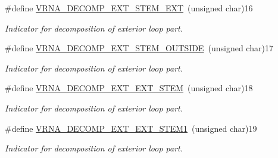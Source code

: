 \begin{DoxyCompactItemize}
\#define \mbox{\hyperlink{group__constraints_gabb09c5b78b75a44502fc77b950125c1e}{V\+R\+N\+A\+\_\+\+D\+E\+C\+O\+M\+P\+\_\+\+E\+X\+T\+\_\+\+S\+T\+E\+M\+\_\+\+E\+XT}}~(unsigned char)16
\begin{DoxyCompactList}\small\item\em Indicator for decomposition of exterior loop part. \end{DoxyCompactList}\item 
\mbox{\label{group__constraints_gae7554cd3ff089360c02e4920229e221c}} 
\#define \mbox{\hyperlink{group__constraints_gae7554cd3ff089360c02e4920229e221c}{V\+R\+N\+A\+\_\+\+D\+E\+C\+O\+M\+P\+\_\+\+E\+X\+T\+\_\+\+S\+T\+E\+M\+\_\+\+O\+U\+T\+S\+I\+DE}}~(unsigned char)17
\begin{DoxyCompactList}\small\item\em Indicator for decomposition of exterior loop part. \end{DoxyCompactList}\item 
\#define \mbox{\hyperlink{group__constraints_ga06efd054c9271438f6d82d4559d9e69f}{V\+R\+N\+A\+\_\+\+D\+E\+C\+O\+M\+P\+\_\+\+E\+X\+T\+\_\+\+E\+X\+T\+\_\+\+S\+T\+EM}}~(unsigned char)18
\begin{DoxyCompactList}\small\item\em Indicator for decomposition of exterior loop part. \end{DoxyCompactList}\item 
\#define \mbox{\hyperlink{group__constraints_ga2e75d7a77118735b32f25422d9686719}{V\+R\+N\+A\+\_\+\+D\+E\+C\+O\+M\+P\+\_\+\+E\+X\+T\+\_\+\+E\+X\+T\+\_\+\+S\+T\+E\+M1}}~(unsigned char)19
\begin{DoxyCompactList}\small\item\em Indicator for decomposition of exterior loop part. \end{DoxyCompactList}\end{DoxyCompactItemize}
